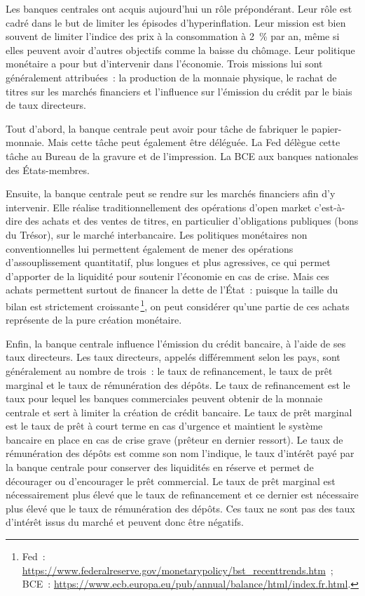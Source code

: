 \documentclass[a4paper,notitlepage]{article}
\newcommand{\sfootnote}{\,\footnote}
\begin{document}

Les banques centrales ont acquis aujourd'hui un rôle prépondérant. Leur rôle est cadré dans le but de limiter les épisodes d'hyperinflation. Leur mission est bien souvent de limiter l'indice des prix à la consommation à 2~\% par an, même si elles peuvent avoir d'autres objectifs comme la baisse du chômage. Leur politique monétaire a pour but d'intervenir dans l'économie. Trois missions lui sont généralement attribuées~: la production de la monnaie physique, le rachat de titres sur les marchés financiers et l'influence sur l'émission du crédit par le biais de taux directeurs.

Tout d'abord, la banque centrale peut avoir pour tâche de fabriquer le papier-monnaie. Mais cette tâche peut également être déléguée. La Fed délègue cette tâche au Bureau de la gravure et de l'impression. La BCE aux banques nationales des États-membres.

Ensuite, la banque centrale peut se rendre sur les marchés financiers afin d'y intervenir. Elle réalise traditionnellement des opérations d'open market c'est-à-dire des achats et des ventes de titres, en particulier d'obligations publiques (bons du Trésor), sur le marché interbancaire. Les politiques monétaires non conventionnelles lui permettent également de mener des opérations d'assouplissement quantitatif, plus longues et plus agressives, ce qui permet d'apporter de la liquidité pour soutenir l'économie en cas de crise. Mais ces achats permettent surtout de financer la dette de l'État~: puisque la taille du bilan est strictement croissante\sfootnote{Fed~: \url{https://www.federalreserve.gov/monetarypolicy/bst_recenttrends.htm}~; BCE~: \url{https://www.ecb.europa.eu/pub/annual/balance/html/index.fr.html}.}, on peut considérer qu'une partie de ces achats représente de la pure création monétaire.

Enfin, la banque centrale influence l'émission du crédit bancaire, à l'aide de ses taux directeurs. Les taux directeurs, appelés différemment selon les pays, sont généralement au nombre de trois~: le taux de refinancement, le taux de prêt marginal et le taux de rémunération des dépôts. Le taux de refinancement est le taux pour lequel les banques commerciales peuvent obtenir de la monnaie centrale et sert à limiter la création de crédit bancaire. Le taux de prêt marginal est le taux de prêt à court terme en cas d'urgence et maintient le système bancaire en place en cas de crise grave (prêteur en dernier ressort). Le taux de rémunération des dépôts est comme son nom l'indique, le taux d'intérêt payé par la banque centrale pour conserver des liquidités en réserve et permet de décourager ou d'encourager le prêt commercial. Le taux de prêt marginal est nécessairement plus élevé que le taux de refinancement et ce dernier est nécessaire plus élevé que le taux de rémunération des dépôts. Ces taux ne sont pas des taux d'intérêt issus du marché et peuvent donc être négatifs.
\end{document}
